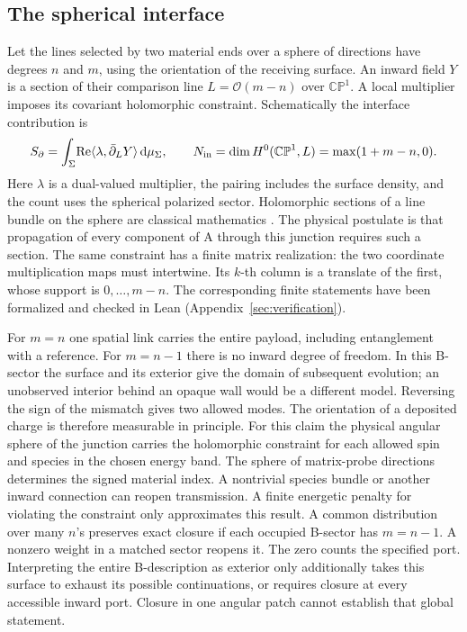 \documentclass[11pt,a4paper]{article}
\newcommand{\dd}{\mathrm d}
\begin{document}
\subsection{The spherical interface}\label{sec:sphere}
Let the lines selected by two material ends over a sphere of directions have degrees \(n\) and \(m\), using the orientation of the receiving surface. An inward field \(Y\) is a section of their comparison line \(L=\mathcal O(m-n)\) over \(\mathbb{CP}^1\). A local multiplier imposes its covariant holomorphic constraint. Schematically the interface contribution is
\begin{equation}
 S_{\partial}=\int_{\Sigma}\! \mathrm{Re}\langle \lambda,\bar\partial_LY\rangle\,
             \dd\mu_{\Sigma},\qquad
 N_{\rm in}=\dim H^0(\mathbb{CP}^1,L)=\max(1+m-n,0).
 \label{eq:route}
\end{equation}
Here \(\lambda\) is a dual-valued multiplier, the pairing includes the surface density, and the count uses the spherical polarized sector. Holomorphic sections of a line bundle on the sphere are classical mathematics \cite{groth}. The physical postulate is that propagation of every component of A through this junction requires such a section. The same constraint has a finite matrix realization: the two coordinate multiplication maps must intertwine. Its \(k\)-th column is a translate of the first, whose support is \(0,\ldots,m-n\). The corresponding finite statements have been formalized and checked in Lean (Appendix~\ref{sec:verification}).

For \(m=n\) one spatial link carries the entire payload, including entanglement with a reference. For \(m=n-1\) there is no inward degree of freedom. In this B-sector the surface and its exterior give the domain of subsequent evolution; an unobserved interior behind an opaque wall would be a different model. Reversing the sign of the mismatch gives two allowed modes. The orientation of a deposited charge is therefore measurable in principle. For this claim the physical angular sphere of the junction carries the holomorphic constraint for each allowed spin and species in the chosen energy band. The sphere of matrix-probe directions determines the signed material index. A nontrivial species bundle or another inward connection can reopen transmission. A finite energetic penalty for violating the constraint only approximates this result. A common distribution over many \(n\)'s preserves exact closure if each occupied B-sector has \(m=n-1\). A nonzero weight in a matched sector reopens it. The zero counts the specified port. Interpreting the entire B-description as exterior only additionally takes this surface to exhaust its possible continuations, or requires closure at every accessible inward port. Closure in one angular patch cannot establish that global statement.
\end{document}
